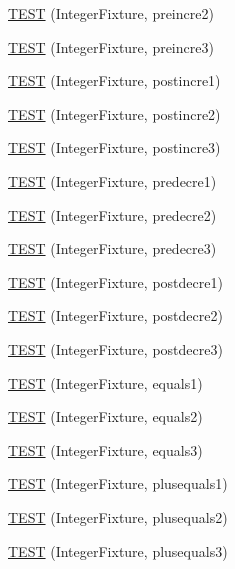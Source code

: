 \begin{DoxyCompactItemize}
\item 
\hyperlink{_test_integer_8c_09_09_adfc83751099bbc9145926ba054a8c453}{T\-E\-S\-T} (Integer\-Fixture, preincre2)
\item 
\hyperlink{_test_integer_8c_09_09_a607e96817960ad36ec733c7b434545cb}{T\-E\-S\-T} (Integer\-Fixture, preincre3)
\item 
\hyperlink{_test_integer_8c_09_09_a0bce5ae03cef7d2b19d25c00f9b560bc}{T\-E\-S\-T} (Integer\-Fixture, postincre1)
\item 
\hyperlink{_test_integer_8c_09_09_afa91fad76d9e16f540f9020f94b3d0ff}{T\-E\-S\-T} (Integer\-Fixture, postincre2)
\item 
\hyperlink{_test_integer_8c_09_09_aebfdb0ec2a3c8ef3a9b51d566a0977fe}{T\-E\-S\-T} (Integer\-Fixture, postincre3)
\item 
\hyperlink{_test_integer_8c_09_09_a52f8ef4525309c8c25d5e8f15ca248fa}{T\-E\-S\-T} (Integer\-Fixture, predecre1)
\item 
\hyperlink{_test_integer_8c_09_09_a93618a456d9df7d3cc8d5fd437ff0ebe}{T\-E\-S\-T} (Integer\-Fixture, predecre2)
\item 
\hyperlink{_test_integer_8c_09_09_a8f38c4c615ca619567542d2c37e25c8d}{T\-E\-S\-T} (Integer\-Fixture, predecre3)
\item 
\hyperlink{_test_integer_8c_09_09_adf469567531cb9fa3a037598936bf0e3}{T\-E\-S\-T} (Integer\-Fixture, postdecre1)
\item 
\hyperlink{_test_integer_8c_09_09_a489040d9f34489502fc159950ee4c22b}{T\-E\-S\-T} (Integer\-Fixture, postdecre2)
\item 
\hyperlink{_test_integer_8c_09_09_a5e5bd8e1a2178f726f13b3eb481d1070}{T\-E\-S\-T} (Integer\-Fixture, postdecre3)
\item 
\hyperlink{_test_integer_8c_09_09_af49f1526a846a2abaecb1266a2aa53d5}{T\-E\-S\-T} (Integer\-Fixture, equals1)
\item 
\hyperlink{_test_integer_8c_09_09_ae58932a92711f57ac65494c4ead377d2}{T\-E\-S\-T} (Integer\-Fixture, equals2)
\item 
\hyperlink{_test_integer_8c_09_09_a42ba62d3f14fe4b5cff95a34e8f13b6d}{T\-E\-S\-T} (Integer\-Fixture, equals3)
\item 
\hyperlink{_test_integer_8c_09_09_acf172005d59d90ec2a717dc5c24ad116}{T\-E\-S\-T} (Integer\-Fixture, plusequals1)
\item 
\hyperlink{_test_integer_8c_09_09_af4b1d9aec3f53685874e394058933ddf}{T\-E\-S\-T} (Integer\-Fixture, plusequals2)
\item 
\hyperlink{_test_integer_8c_09_09_ab38cb518840e042d883dbd9f99294cfd}{T\-E\-S\-T} (Integer\-Fixture, plusequals3)

\end{DoxyCompactItemize}
